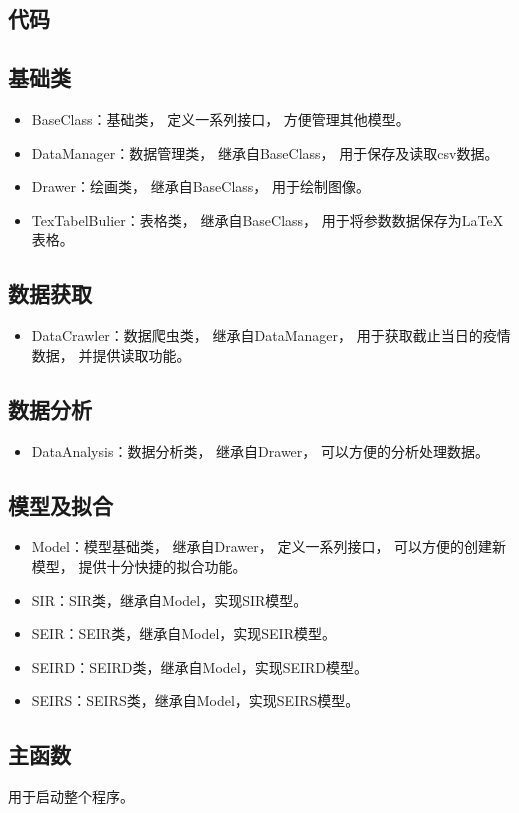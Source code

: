 \begin{appendix}
    \section{代码}
    \subsection{基础类}
    \begin{itemize}
        \item BaseClass：基础类，
              定义一系列接口，
              方便管理其他模型。
        \item DataManager：数据管理类，
              继承自BaseClass，
              用于保存及读取csv数据。
        \item Drawer：绘画类，
              继承自BaseClass，
              用于绘制图像。
        \item TexTabelBulier：表格类，
              继承自BaseClass，
              用于将参数数据保存为LaTeX表格。
    \end{itemize}
    
    \subsection{数据获取}
    \begin{itemize}
        \item DataCrawler：数据爬虫类，
              继承自DataManager，
              用于获取截止当日的疫情数据，
              并提供读取功能。
    \end{itemize}
    
    \subsection{数据分析}
    \begin{itemize}
        \item DataAnalysis：数据分析类，
              继承自Drawer，
              可以方便的分析处理数据。
    \end{itemize}
    
    \subsection{模型及拟合}
    \begin{itemize}
        \item Model：模型基础类，
              继承自Drawer，
              定义一系列接口，
              可以方便的创建新模型，
              提供十分快捷的拟合功能。
        \item SIR：SIR类，继承自Model，实现SIR模型。
        \item SEIR：SEIR类，继承自Model，实现SEIR模型。
        \item SEIRD：SEIRD类，继承自Model，实现SEIRD模型。
        \item SEIRS：SEIRS类，继承自Model，实现SEIRS模型。
    \end{itemize}
    
    \subsection{主函数}
    \par 用于启动整个程序。
    
\end{appendix}